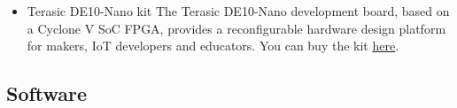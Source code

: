 \begin{flushleft}

\begin{itemize}

\item Terasic DE10-Nano kit
\newline
\newline
The Terasic DE10-Nano development board, based on a Cyclone\textsuperscript{\textregistered} V SoC FPGA, provides a reconfigurable hardware design platform for makers, IoT developers and educators. You can buy the kit \href{https://www.terasic.com.tw/cgi-bin/page/archive.pl?Language=English&No=1046}{\underline{here}}.

\end{itemize}

\end{flushleft}

\subsection*{Software}

